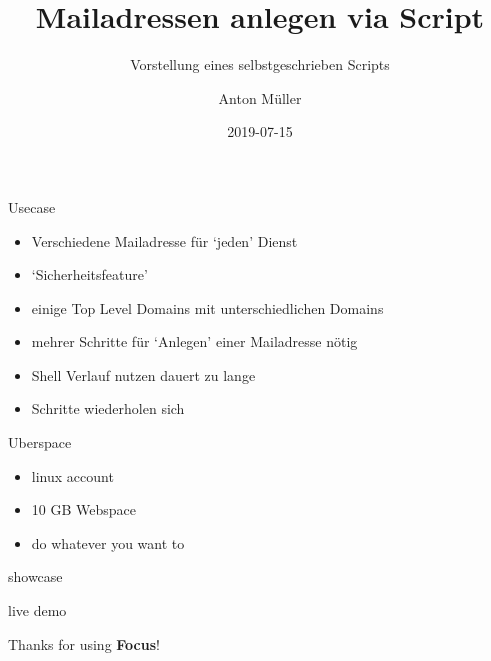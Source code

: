 \documentclass{beamer}
\title{Mailadressen anlegen via Script}
\subtitle{Vorstellung eines selbstgeschrieben Scripts}
\author{Anton Müller}
\institute{Vorstellungsgespräch bei der\\T-System Multi Media Solutions}
\date{2019-07-15}
\begin{document}
    \begin{frame}
        \maketitle
    \end{frame}
    
\begin{frame}{Usecase}
\protect\hypertarget{usecase}{}

\begin{itemize}
\item
  Verschiedene Mailadresse für `jeden' Dienst
\item
  `Sicherheitsfeature'
\item
  einige Top Level Domains mit unterschiedlichen Domains
\item
  mehrer Schritte für `Anlegen' einer Mailadresse nötig
\item
  Shell Verlauf nutzen dauert zu lange
\item
  Schritte wiederholen sich
\end{itemize}

\end{frame}

\begin{frame}{Uberspace}
\protect\hypertarget{uberspace}{}

\begin{itemize}
\item
  linux account
\item
  10 GB Webspace
\item
  do whatever you want to
\end{itemize}

\end{frame}

\begin{frame}{showcase}
\protect\hypertarget{showcase}{}

\begin{block}{live demo}

\end{block}

\end{frame}

    \begin{frame}[focus]
        Thanks for using \textbf{Focus}!
    \end{frame}
    
\end{document}
